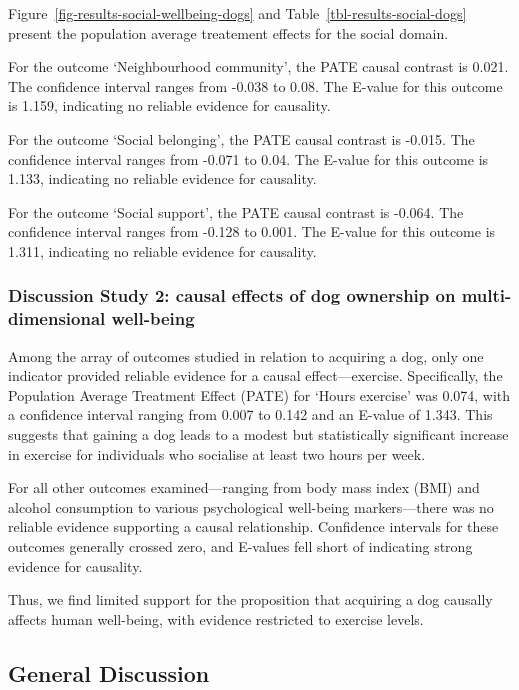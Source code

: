 \documentclass[
  singlecolumn,
  9pt]{article}
\begin{document}
Figure~\ref{fig-results-social-wellbeing-dogs} and
Table~\ref{tbl-results-social-dogs} present the population average
treatement effects for the social domain.

For the outcome `Neighbourhood community', the PATE causal contrast is
0.021. The confidence interval ranges from -0.038 to 0.08. The E-value
for this outcome is 1.159, indicating no reliable evidence for
causality.

For the outcome `Social belonging', the PATE causal contrast is -0.015.
The confidence interval ranges from -0.071 to 0.04. The E-value for this
outcome is 1.133, indicating no reliable evidence for causality.

For the outcome `Social support', the PATE causal contrast is -0.064.
The confidence interval ranges from -0.128 to 0.001. The E-value for
this outcome is 1.311, indicating no reliable evidence for causality.

\subsubsection{Discussion Study 2: causal effects of dog ownership on
multi-dimensional
well-being}\label{discussion-study-2-causal-effects-of-dog-ownership-on-multi-dimensional-well-being}

Among the array of outcomes studied in relation to acquiring a dog, only
one indicator provided reliable evidence for a causal effect---exercise.
Specifically, the Population Average Treatment Effect (PATE) for `Hours
exercise' was 0.074, with a confidence interval ranging from 0.007 to
0.142 and an E-value of 1.343. This suggests that gaining a dog leads to
a modest but statistically significant increase in exercise for
individuals who socialise at least two hours per week.

For all other outcomes examined---ranging from body mass index (BMI) and
alcohol consumption to various psychological well-being markers---there
was no reliable evidence supporting a causal relationship. Confidence
intervals for these outcomes generally crossed zero, and E-values fell
short of indicating strong evidence for causality.

Thus, we find limited support for the proposition that acquiring a dog
causally affects human well-being, with evidence restricted to exercise
levels.

\subsection{General Discussion}\label{general-discussion}
\end{document}

